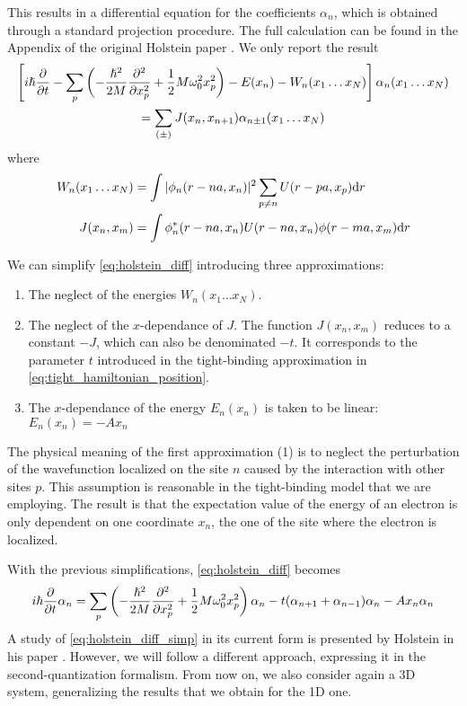 This results in a differential equation for the coefficients $\alpha_n$, which is obtained through a standard projection procedure. The full calculation can be found in the Appendix of the original Holstein paper \cite{holstein1959}. We only report the result
\begin{multline} \label{eq:holstein_diff}
    \left[ i\hslash \pdv{}{t} - \sum_p \left( -\frac{\hslash^2}{2M} \pdv[2]{}{x_p} + \frac{1}{2} M \omega_0^2 x_p^2 \right) - E(x_n) - W_n(x_1\dots x_N) \right] \alpha_n(x_1\dots x_N)
    \\= \sum_{(\pm)} J(x_n, x_{n+1}) \alpha_{n\pm1}(x_1\dots x_N)
\end{multline}
where
\begin{align}
    W_n(x_1 \dots x_N) & = \int |\phi_n(r-na, x_n)|^2  \sum_{p \neq n} U(r-pa, x_p)  \differential r \\
    J(x_n, x_m)        & = \int \phi_n^*(r-na, x_n) U(r-na, x_n) \phi(r-ma, x_m) \differential r
\end{align}

We can simplify \cref{eq:holstein_diff} introducing three approximations:
\begin{enumerate}
    \item The neglect of the energies $ W_n(x_1 \dots x_N)$.
    \item The neglect of the $x$-dependance of $J$. The function $J(x_n, x_m)$ reduces to a constant $-J$, which can also be denominated $-t$. It corresponds to the parameter $t$ introduced in the tight-binding approximation in \cref{eq:tight_hamiltonian_position}.
    \item The $x$-dependance of the energy $E_n(x_n)$ is taken to be linear: $    E_n(x_n) = - A x_n$
\end{enumerate}
The physical meaning of the first approximation (1) is to neglect the perturbation of the wavefunction localized on the site $n$ caused by the interaction with other sites $p$. This assumption is reasonable in the tight-binding model that we are employing. The result is that the expectation value of the energy of an electron is only dependent on one coordinate $x_n$, the one of the site where the electron is localized.

With the previous simplifications, \cref{eq:holstein_diff} becomes
\begin{equation} \label{eq:holstein_diff_simp}
    i\hslash\pdv{}{t} \alpha_n = \sum_p\left( -\frac{\hslash^2}{2M} \pdv[2]{}{x_p} + \frac{1}{2} M \omega_0^2 x_p^2 \right) \alpha_n - t (\alpha_{n+1}+\alpha_{n-1})\alpha_n
    - A x_n \alpha_n
\end{equation}
A study of \cref{eq:holstein_diff_simp} in its current form is presented by Holstein in his paper \cite{holstein1959}. However, we will follow a different approach, expressing it in the second-quantization formalism. From now on, we also consider again a 3D system, generalizing the results that we obtain for the 1D one.

